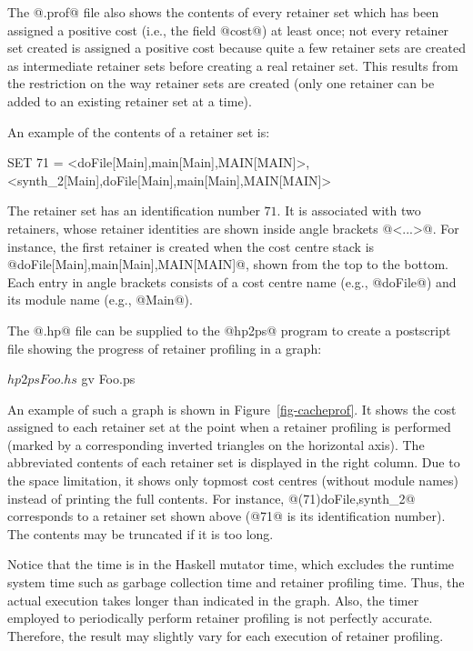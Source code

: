 \documentclass{article}
\begin{document}
The @.prof@ file also shows the contents of every retainer set which 
has been assigned a positive cost (i.e., the field @cost@) at least once;
not every retainer set created is assigned a positive cost because quite
a few retainer sets are created as intermediate retainer sets before
creating a real retainer set. This results from the restriction on the way
retainer sets are created (only one retainer can be added to an existing
retainer set at a time).

An example of the contents of a retainer set is:

\begin{code}
SET 71 = {<doFile[Main],main[Main],MAIN[MAIN]>, <synth_2[Main],doFile[Main],main[Main],MAIN[MAIN]>}
\end{code}

The retainer set has an identification number $71$.
It is associated with two retainers, whose retainer identities are shown 
inside angle brackets @<...>@.
For instance, the first retainer is created when the cost centre stack
is @doFile[Main],main[Main],MAIN[MAIN]@, shown from the top to the bottom.
Each entry in angle brackets consists of a cost centre name (e.g., @doFile@) 
and its module name (e.g., @Main@).

The @.hp@ file can be supplied to the @hp2ps@ program to create a postscript 
file showing the progress of retainer profiling in a graph:

\begin{code}
$ hp2ps Foo.hs
$ gv Foo.ps
\end{code}

An example of such a graph is shown in Figure~\ref{fig-cacheprof}.
It shows the cost assigned to each retainer set at the point 
when a retainer profiling is performed (marked by a corresponding inverted 
triangles on the horizontal axis). 
The abbreviated contents of each retainer set is displayed in the right column.
Due to the space limitation,
it shows only topmost cost centres (without module names)
instead of printing the full contents.
For instance, @(71)doFile,synth_2@ corresponds to a retainer set shown above 
(@71@ is its identification number).
The contents may be truncated if it is too long. 

Notice that the time is in the Haskell mutator time, which excludes 
the runtime system time such as garbage collection time and retainer profiling
time. Thus, the actual execution takes longer than indicated in the
graph. Also, the timer employed to periodically perform retainer profiling
is not perfectly accurate. Therefore, the result may slightly vary for each
execution of retainer profiling.
\end{document}
